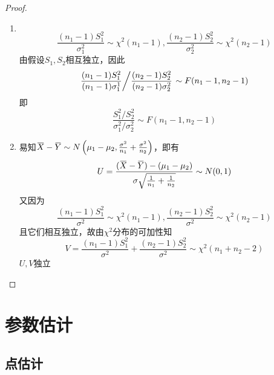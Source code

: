\documentclass[11pt]{article}
\begin{document}
\begin{proof}
\begin{enumerate}
\item \(\hspace{1cm}\)
\begin{equation*}
\frac{(n_1-1)S_1^2}{\sigma_1^2}\sim\chi^2(n_1-1),\frac{(n_2-1)S_2^2}{\sigma_2^2}\sim
\chi^2(n_2-1)
\end{equation*}
由假设\(S_1,S_2\)相互独立，因此
\begin{equation*}
\left.\frac{(n_1-1)S_1^2}{(n_1-1)\sigma_1^1}\middle/
\frac{(n_2-1)S_2^2}{(n_2-1)\sigma_2^2}\right.
\sim F(n_1-1,n_2-1)
\end{equation*}
即
\begin{equation*}
\frac{S_1^2/S_2^2}{\sigma_1^2/\sigma_2^2}\sim F(n_1-1,n_2-1)
\end{equation*}
\item 易知\(\bbar{X}-\bbar{Y}\sim
      N\left(\mu_1-\mu_2,\frac{\sigma^2}{n_1}+\frac{\sigma^2}{n_2}\right)\)，即有
\begin{equation*}
U=\frac{(\bbar{X}-\bbar{Y})-(\mu_1-\mu_2)}{
\sigma\sqrt{\frac{1}{n_1}+\frac{1}{n_2}}}\sim N(0,1)
\end{equation*}
又因为
\begin{equation*}
\frac{(n_1-1)S_1^2}{\sigma^2}\sim\chi^2(n_1-1),\frac{(n_2-1)S^2_2}{\sigma^2}
\sim\chi^2(n_2-1)
\end{equation*}
且它们相互独立，故由\(\chi^2\)分布的可加性知
\begin{equation*}
V=\frac{(n_1-1)S_1^2}{\sigma^2}+\frac{(n_2-1)S_2^2}{\sigma^2}\sim\chi^2(n_1+n_2-2)
\end{equation*}
\(U,V\)独立
\end{enumerate}
\end{proof}

\section{参数估计}
\label{sec:orgd3e15a4}
\subsection{点估计}
\label{sec:orgfe1c6f7}
\end{document}
